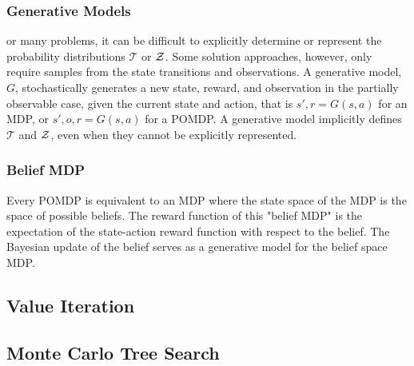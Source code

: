 \subsubsection{Generative Models}

or many problems, it can be difficult to explicitly determine or represent the probability distributions $\mathcal{T}$ or $\mathcal{Z}$.
Some solution approaches, however, only require samples from the state transitions and observations.
A generative model, $G$, stochastically generates a new state, reward, and observation in the partially observable case, given the current state and action, that is $s', r = G(s,a)$ for an MDP, or $s', o, r = G(s, a)$ for a POMDP.
A generative model implicitly defines $\mathcal{T}$ and $\mathcal{Z}$, even when they cannot be explicitly represented.

\subsubsection{Belief MDP}

Every POMDP is equivalent to an MDP where the state space of the MDP is the space of possible beliefs.
The reward function of this "belief MDP" is the expectation of the state-action reward function with respect to the belief.
The Bayesian update of the belief serves as a generative model for the belief space MDP.

\subsection{Value Iteration}

\subsection{Monte Carlo Tree Search} \label{sec:mcts}

